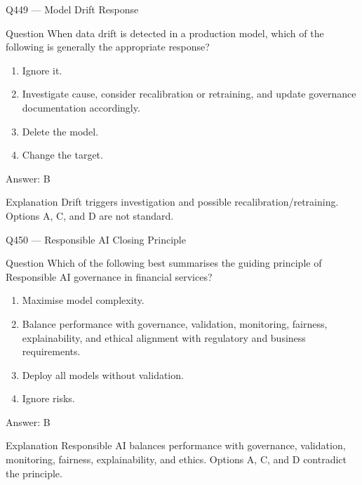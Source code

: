 \documentclass[aspectratio=169,8pt]{beamer}
\begin{document}
	
	\begin{frame}{Q449 --- Model Drift Response}
		\begin{block}{Question}
			When data drift is detected in a production model, which of the following is generally the appropriate response?
			\begin{enumerate}
				\item Ignore it.
				\item Investigate cause, consider recalibration or retraining, and update governance documentation accordingly.
				\item Delete the model.
				\item Change the target.
			\end{enumerate}
		\end{block}
		\begin{exampleblock}{Answer: B}\end{exampleblock}
		\begin{block}{Explanation}
			Drift triggers investigation and possible recalibration/retraining. Options A, C, and D are not standard.
		\end{block}
	\end{frame}
	
	\begin{frame}{Q450 --- Responsible AI Closing Principle}
		\begin{block}{Question}
			Which of the following best summarises the guiding principle of Responsible AI governance in financial services?
			\begin{enumerate}
				\item Maximise model complexity.
				\item Balance performance with governance, validation, monitoring, fairness, explainability, and ethical alignment with regulatory and business requirements.
				\item Deploy all models without validation.
				\item Ignore risks.
			\end{enumerate}
		\end{block}
		\begin{exampleblock}{Answer: B}\end{exampleblock}
		\begin{block}{Explanation}
			Responsible AI balances performance with governance, validation, monitoring, fairness, explainability, and ethics. Options A, C, and D contradict the principle.
		\end{block}
	\end{frame}
	
	
\end{document}
